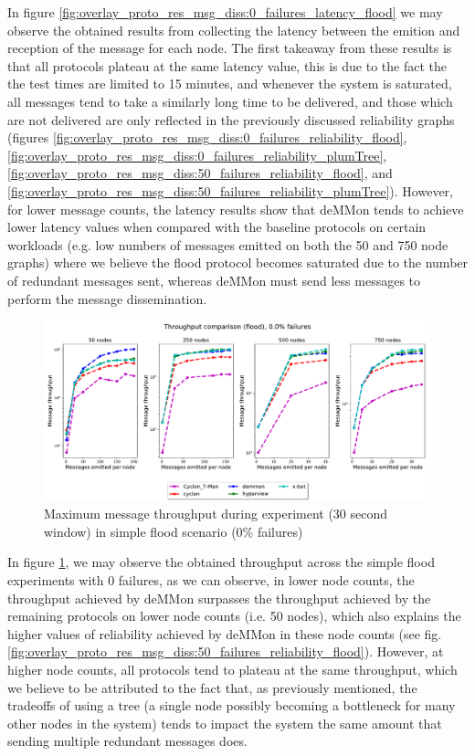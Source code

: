 In figure \ref{fig:overlay_proto_res_msg_diss:0_failures_latency_flood} we may observe the obtained results from collecting the latency between the emition and reception of the message for each node. The first takeaway from these results is that all protocols plateau at the same latency value, this is due to the fact the the test times are limited to 15 minutes, and whenever the system is saturated, all messages tend to take a similarly long time to be delivered, and those which are not delivered are only reflected in the previously discussed reliability graphs (figures \ref{fig:overlay_proto_res_msg_diss:0_failures_reliability_flood}, \ref{fig:overlay_proto_res_msg_diss:0_failures_reliability_plumTree}, \ref{fig:overlay_proto_res_msg_diss:50_failures_reliability_flood}, and \ref{fig:overlay_proto_res_msg_diss:50_failures_reliability_plumTree}). However, for lower message counts, the latency results show that deMMon tends to achieve lower latency values when compared with the baseline protocols on certain workloads (e.g. low numbers of messages emitted on both the 50 and 750 node graphs) where we believe the flood protocol becomes saturated due to the number of redundant messages sent, whereas deMMon must send less messages to perform the message dissemination.

\begin{figure}[htbp]
    \centering
    \includegraphics[width=\linewidth]{Chapters/evaluation/figures/flood/flood_0.0_failures_throughput.pdf}
    \caption{Maximum message throughput during experiment (30 second window) in simple flood scenario (0\% failures)}
    \label{fig:overlay_proto_res_msg_diss:0_failures_throughput_flood}
\end{figure}

In figure \ref{fig:overlay_proto_res_msg_diss:0_failures_throughput_flood}, we may observe the obtained throughput across the simple flood experiments with 0 failures, as we can observe, in lower node counts, the throughput achieved by deMMon surpasses the throughput achieved by the remaining protocols on lower node counts (i.e. 50 nodes), which also explains the higher values of reliability achieved by deMMon in these node counts (see fig. \ref{fig:overlay_proto_res_msg_diss:50_failures_reliability_flood}). However, at higher node counts, all protocols tend to plateau at the same throughput, which we believe to be attributed to the fact that, as previously mentioned, the tradeoffs of using a tree (a single node possibly becoming a bottleneck for many other nodes in the system) tends to impact the system the same amount that sending multiple redundant messages does.


